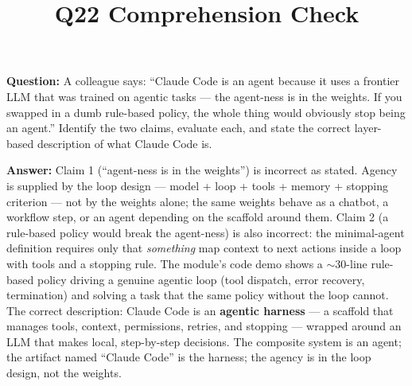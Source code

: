 \documentclass[11pt]{article}
\title{Q22 Comprehension Check}
\date{}
\begin{document}
\maketitle
\textbf{Question:} A colleague says: ``Claude Code is an agent because it uses a frontier LLM that was trained on agentic tasks --- the agent-ness is in the weights. If you swapped in a dumb rule-based policy, the whole thing would obviously stop being an agent.'' Identify the two claims, evaluate each, and state the correct layer-based description of what Claude Code is.

\vspace{1em}
\textbf{Answer:} Claim 1 (``agent-ness is in the weights'') is incorrect as stated. Agency is supplied by the loop design --- model + loop + tools + memory + stopping criterion --- not by the weights alone; the same weights behave as a chatbot, a workflow step, or an agent depending on the scaffold around them. Claim 2 (a rule-based policy would break the agent-ness) is also incorrect: the minimal-agent definition requires only that \emph{something} map context to next actions inside a loop with tools and a stopping rule. The module's code demo shows a $\sim$30-line rule-based policy driving a genuine agentic loop (tool dispatch, error recovery, termination) and solving a task that the same policy without the loop cannot. The correct description: Claude Code is an \textbf{agentic harness} --- a scaffold that manages tools, context, permissions, retries, and stopping --- wrapped around an LLM that makes local, step-by-step decisions. The composite system is an agent; the artifact named ``Claude Code'' is the harness; the agency is in the loop design, not the weights.
\end{document}
